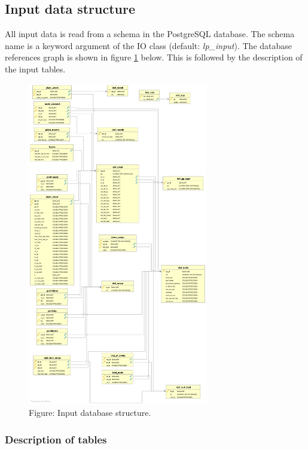 \documentclass[]{article}
\begin{document}
\subsection{Input data structure}\label{input-data-structure}

All input data is read from a schema in the PostgreSQL database. The
schema name is a keyword argument of the IO class (default:
\emph{lp\_input}). The database references graph is shown in figure \ref{input_db_ref}
below. This is followed by the description of the input tables.

\begin{figure}[htbp]
\centering
\includegraphics[width=0.7\textwidth]{input_db.png}
\caption{Figure: Input database structure.}
\label{input_db_ref}
\end{figure}

\subsubsection{Description of tables}\label{description-of-tables}
\end{document}

